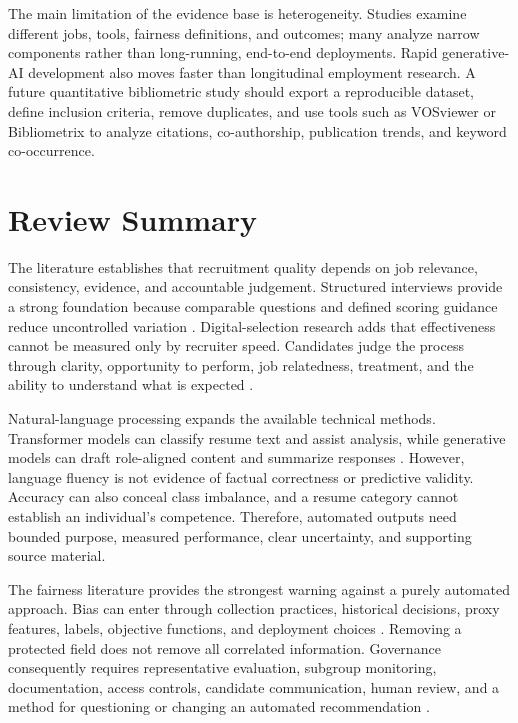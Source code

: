 \documentclass[12pt,a4paper,oneside]{report}
\renewcommand{\cite}[1]{}
\begin{document}
The main limitation of the evidence base is heterogeneity. Studies examine different
jobs, tools, fairness definitions, and outcomes; many analyze narrow components rather
than long-running, end-to-end deployments. Rapid generative-AI development also moves
faster than longitudinal employment research. A future quantitative bibliometric study
should export a reproducible dataset, define inclusion criteria, remove duplicates,
and use tools such as VOSviewer or Bibliometrix to analyze citations, co-authorship,
publication trends, and keyword co-occurrence.

\clearpage
\section{Review Summary}

The literature establishes that recruitment quality depends on job relevance,
consistency, evidence, and accountable judgement. Structured interviews provide a
strong foundation because comparable questions and defined scoring guidance reduce
uncontrolled variation \cite{campion1997,schmidt1998}. Digital-selection research adds
that effectiveness cannot be measured only by recruiter speed. Candidates judge the
process through clarity, opportunity to perform, job relatedness, treatment, and the
ability to understand what is expected \cite{gilliland1993,woods2020}.

Natural-language processing expands the available technical methods. Transformer
models can classify resume text and assist analysis, while generative models can draft
role-aligned content and summarize responses \cite{devlin2019,sanh2019}. However,
language fluency is not evidence of factual correctness or predictive validity.
Accuracy can also conceal class imbalance, and a resume category cannot establish an
individual's competence. Therefore, automated outputs need bounded purpose, measured
performance, clear uncertainty, and supporting source material.

The fairness literature provides the strongest warning against a purely automated
approach. Bias can enter through collection practices, historical decisions, proxy
features, labels, objective functions, and deployment choices
\cite{kochling2020,raghavan2020}. Removing a protected field does not remove all
correlated information. Governance consequently requires representative evaluation,
subgroup monitoring, documentation, access controls, candidate communication, human
review, and a method for questioning or changing an automated recommendation
\cite{nist2023,eu2024,eeoc2023}.
\end{document}
